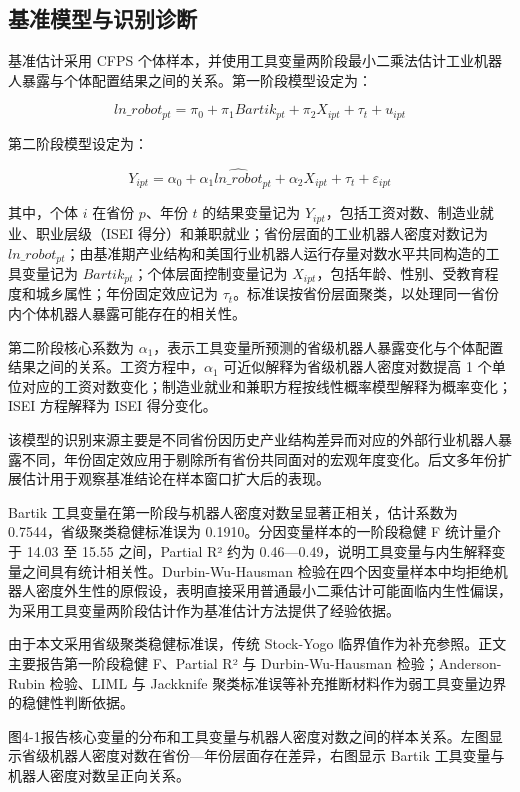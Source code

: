 \documentclass[UTF8, zihao=-4, a4paper, openany, fontset=none]{ctexrep}
\numberwithin{equation}{chapter}
\begin{document}
\subsection{基准模型与识别诊断}\label{ux57faux51c6ux6a21ux578bux4e0eux8bc6ux522bux8bcaux65ad}

基准估计采用 CFPS 个体样本，并使用工具变量两阶段最小二乘法估计工业机器人暴露与个体配置结果之间的关系。第一阶段模型设定为：

\[
ln\_robot_{pt}=\pi_0+\pi_1Bartik_{pt}+\pi_2X_{ipt}+\tau_t+u_{ipt}
\]

第二阶段模型设定为：

\[
Y_{ipt}=\alpha_0+\alpha_1\widehat{ln\_robot}_{pt}+\alpha_2X_{ipt}+\tau_t+\varepsilon_{ipt}
\]

其中，个体 \(i\) 在省份 \(p\)、年份 \(t\) 的结果变量记为 \(Y_{ipt}\)，包括工资对数、制造业就业、职业层级（ISEI 得分）和兼职就业；省份层面的工业机器人密度对数记为 \(ln\_robot_{pt}\)；由基准期产业结构和美国行业机器人运行存量对数水平共同构造的工具变量记为 \(Bartik_{pt}\)；个体层面控制变量记为 \(X_{ipt}\)，包括年龄、性别、受教育程度和城乡属性；年份固定效应记为 \(\tau_t\)。标准误按省份层面聚类，以处理同一省份内个体机器人暴露可能存在的相关性。

第二阶段核心系数为 \(\alpha_1\)，表示工具变量所预测的省级机器人暴露变化与个体配置结果之间的关系。工资方程中，\(\alpha_1\) 可近似解释为省级机器人密度对数提高 1 个单位对应的工资对数变化；制造业就业和兼职方程按线性概率模型解释为概率变化；ISEI 方程解释为 ISEI 得分变化。

该模型的识别来源主要是不同省份因历史产业结构差异而对应的外部行业机器人暴露不同，年份固定效应用于剔除所有省份共同面对的宏观年度变化。后文多年份扩展估计用于观察基准结论在样本窗口扩大后的表现。

Bartik 工具变量在第一阶段与机器人密度对数呈显著正相关，估计系数为 0.7544，省级聚类稳健标准误为 0.1910。分因变量样本的一阶段稳健 F 统计量介于 14.03 至 15.55 之间，Partial R² 约为 0.46---0.49，说明工具变量与内生解释变量之间具有统计相关性。Durbin-Wu-Hausman 检验在四个因变量样本中均拒绝机器人密度外生性的原假设，表明直接采用普通最小二乘估计可能面临内生性偏误，为采用工具变量两阶段估计作为基准估计方法提供了经验依据。

由于本文采用省级聚类稳健标准误，传统 Stock-Yogo 临界值作为补充参照。正文主要报告第一阶段稳健 F、Partial R² 与 Durbin-Wu-Hausman 检验；Anderson-Rubin 检验、LIML 与 Jackknife 聚类标准误等补充推断材料作为弱工具变量边界的稳健性判断依据。

图4-1报告核心变量的分布和工具变量与机器人密度对数之间的样本关系。左图显示省级机器人密度对数在省份---年份层面存在差异，右图显示 Bartik 工具变量与机器人密度对数呈正向关系。
\end{document}
